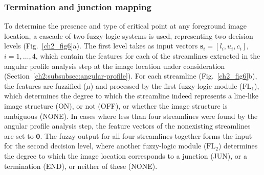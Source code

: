\subsubsection{Termination and junction mapping}
\label{ch2:sec:cp-detection}
To determine the presence and type of critical point at any foreground image location, a cascade of two fuzzy-logic systems is used, representing two decision levels (Fig.~\ref{ch2_fig6}a). The first level takes as input vectors $\mathbf{s}_{i}=[l_{i},u_{i},c_{i}]$, $i=1,\dots,4$, which contain the features for each of the streamlines extracted in the angular profile analysis step at the image location under consideration (Section~\ref{ch2:subsubsec:angular-profile}). For each streamline (Fig.~\ref{ch2_fig6}b), the features are fuzzified ($\mu$) and processed by the first fuzzy-logic module ($\textrm{FL}_{1}$), which determines the degree to which the streamline indeed represents a line-like image structure (ON), or not (OFF), or whether the image structure is ambiguous (NONE). In cases where less than four streamlines were found by the angular profile analysis step, the feature vectors of the nonexisting streamlines are set to $\mathbf{0}$. The fuzzy output for all four streamlines together forms the input for the second decision level, where another fuzzy-logic module ($\textrm{FL}_{2}$) determines the degree to which the image location corresponds to a junction (JUN), or a termination (END), or neither of these (NONE).

